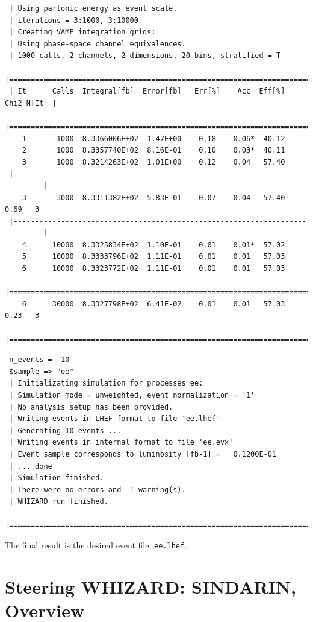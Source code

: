 \documentclass[12pt]{book}
\newcommand{\ttt}[1]{\texttt{#1}}
\begin{document}
\begin{footnotesize}
 \begin{verbatim}
 | Using partonic energy as event scale.
 | iterations = 3:1000, 3:10000
 | Creating VAMP integration grids:
 | Using phase-space channel equivalences.
 | 1000 calls, 2 channels, 2 dimensions, 20 bins, stratified = T
 |=============================================================================|
 | It      Calls  Integral[fb]  Error[fb]   Err[%]    Acc  Eff[%]   Chi2 N[It] |
 |=============================================================================|
    1       1000  8.3366006E+02  1.47E+00    0.18    0.06*  40.12
    2       1000  8.3357740E+02  8.16E-01    0.10    0.03*  40.11
    3       1000  8.3214263E+02  1.01E+00    0.12    0.04   57.40
 |-----------------------------------------------------------------------------|
    3       3000  8.3311382E+02  5.83E-01    0.07    0.04   57.40    0.69   3
 |-----------------------------------------------------------------------------|
    4      10000  8.3325834E+02  1.10E-01    0.01    0.01*  57.02
    5      10000  8.3333796E+02  1.11E-01    0.01    0.01   57.03
    6      10000  8.3323772E+02  1.11E-01    0.01    0.01   57.03
 |=============================================================================|
    6      30000  8.3327798E+02  6.41E-02    0.01    0.01   57.03    0.23   3
 |=============================================================================|
 \end{verbatim}

 \begin{verbatim}
 n_events =  10
 $sample => "ee"
 | Initializating simulation for processes ee:
 | Simulation mode = unweighted, event_normalization = '1'
 | No analysis setup has been provided.
 | Writing events in LHEF format to file 'ee.lhef'
 | Generating 10 events ...
 | Writing events in internal format to file 'ee.evx'
 | Event sample corresponds to luminosity [fb-1] =   0.1200E-01
 | ... done
 | Simulation finished.
 | There were no errors and  1 warning(s).
 | WHIZARD run finished.
 |=============================================================================|
 \end{verbatim}
 \end{footnotesize}
The final result is the desired event file, \ttt{ee.lhef}.



\chapter{Steering WHIZARD: SINDARIN, Overview}
\label{chap:sindarinintro}
\end{document}
